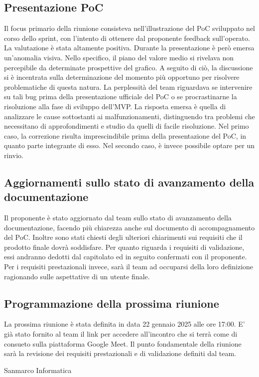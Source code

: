\subsection{Presentazione PoC}
Il focus primario della riunione consisteva nell’illustrazione del PoC sviluppato nel corso dello sprint, con l’intento di ottenere dal proponente feedback sull’operato. 
La valutazione è stata altamente positiva. Durante la presentazione è però emersa un’anomalia visiva. Nello specifico, il piano del valore medio si rivelava non percepibile da determinate prospettive del grafico.
A seguito di ciò, la discussione si è incentrata sulla determinazione del momento più opportuno per risolvere problematiche di questa natura. La perplessità del team riguardava se intervenire su tali bug prima della presentazione ufficiale del PoC o se procrastinarne la risoluzione alla fase di sviluppo dell’MVP. 
La risposta emersa è quella di analizzare le cause sottostanti ai malfunzionamenti, distinguendo tra problemi che necessitano di approfondimenti e studio da quelli di facile risoluzione. Nel primo caso, la correzione risulta imprescindibile prima della presentazione del PoC, in quanto parte integrante di esso. Nel secondo caso, è invece possibile optare per un rinvio.
\subsection{Aggiornamenti sullo stato di avanzamento della documentazione}
Il proponente è stato aggiornato dal team sullo stato di avanzamento della documentazione, facendo più chiarezza anche sul documento di accompagnamento del PoC.
Inoltre sono stati chiesti degli ulteriori chiarimenti sui requisiti che il prodotto finale dovrà soddisfare.
Per quanto riguarda i requisiti di validazione, essi andranno dedotti dal capitolato ed in seguito confermati con il proponente.
Per i requisiti prestazionali invece, sarà il team ad occuparsi della loro definizione ragionando sulle aspettative di un utente finale.
\subsection{Programmazione della prossima riunione}
La prossima riunione è stata definita in data 22 gennaio 2025 alle ore 17:00. E' già stato fornito al team il link per accedere all'incontro che si terrà come di consueto
sulla piattaforma Google Meet. Il punto fondamentale della riunione sarà la revisione dei requisiti prestazionali e di validazione definiti dal team.


\hfill\signature{Approvazione esterna}{Sanmarco Informatica}
